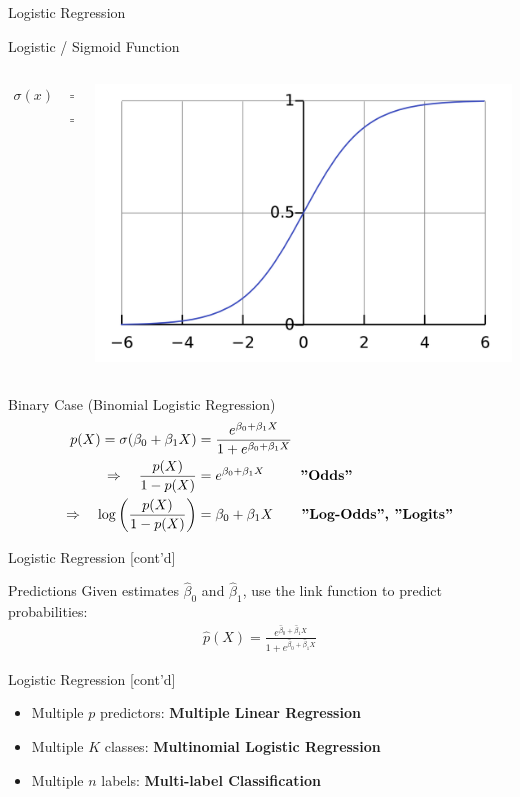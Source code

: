 \documentclass[ignorenonframetext,xcolor=x11names]{beamer}
\begin{document}
\begin{frame}{Logistic Regression}
\begin{block}{Logistic / Sigmoid Function}
\begin{columns}
\begin{column}{0.6\textwidth}
\begin{align*}
  \sigma(x) &= \frac{1}{1 + e^{-x}} = \frac{e^x}{1 + e^x} \\
  &= 1 - \sigma(-x)
\end{align*}
\end{column}
\begin{column}{0.4\textwidth}
\includegraphics[height=.8in]{logistic.png}
\end{column}
\end{columns}
\end{block}

\begin{block}{Binary Case (Binomial Logistic Regression)}
\small
\begin{align*}
p(X) = \sigma( \beta_0 + \beta_1 X) &= \frac{e^{\beta_0 + \beta_1 X}}{1 + e^{\beta_0 + \beta_1 X}} \\
\Rightarrow \quad \frac{p(X)}{1 - p(X)} &= e^{\beta_0 + \beta_1 X} \qquad\;\; \text{\textbf{''Odds''}} \\
\Rightarrow \quad \log \left( \frac{p(X)}{1 - p(X)} \right) &= \beta_0 + \beta_1 X \qquad \text{\textbf{''Log-Odds'', ''Logits''}}
\end{align*}
\end{block}
\end{frame}

\begin{frame}{Logistic Regression \small [cont'd]}
\begin{block}{Predictions}
Given estimates $\hat{\beta}_0$ and $\hat{\beta}_1$, use the link function to predict probabilities:
\begin{align*}
  \hat{p}(X) = \frac{e^{\hat{\beta}_0 + \hat{\beta}_1 X}}{1 + e^{\hat{\beta}_0 + \hat{\beta}_1 X}}
\end{align*}
\end{block}
\end{frame}

\begin{frame}{Logistic Regression \small [cont'd]}
\begin{itemize}
   \item Multiple $p$ predictors: \textbf{Multiple Linear Regression}
   \item Multiple $K$ classes: \textbf{Multinomial Logistic Regression}
   \item Multiple $n$ labels: \textbf{Multi-label Classification}
\end{itemize}
\end{frame}
\end{document}
